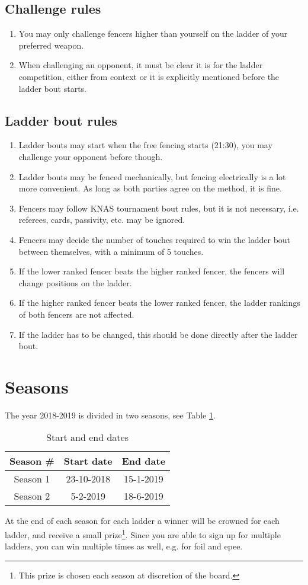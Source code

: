 \documentclass{article}
\begin{document}
\subsection{Challenge rules}
\begin{enumerate}
    \item You may only challenge fencers higher than yourself on the ladder of your preferred weapon.
    \item When challenging an opponent, it must be clear it is for the ladder competition, either from context or it is explicitly mentioned before the ladder bout starts.
\end{enumerate}
\subsection{Ladder bout rules}
\begin{enumerate}
    \item Ladder bouts may start when the free fencing starts (21:30), you may challenge your opponent before though.
    \item Ladder bouts may be fenced mechanically, but fencing electrically is a lot more convenient. As long as both parties agree on the method, it is fine.
    \item Fencers may follow KNAS tournament bout rules, but it is not necessary, i.e. referees, cards, passivity, etc. may be ignored.
    \item Fencers may decide the number of touches required to win the ladder bout between themselves, with a minimum of 5 touches.
    \item If the lower ranked fencer beats the higher ranked fencer, the fencers will change positions on the ladder.
    \item If the higher ranked fencer beats the lower ranked fencer, the ladder rankings of both fencers are not affected.
    \item If the ladder has to be changed, this should be done directly after the ladder bout.
\end{enumerate}
\section{Seasons} \label{sec:Seasons}
The year 2018-2019 is divided in two seasons, see Table \ref{tab:dates}.
\begin{table}[ht]
    \centering
    \begin{tabular}{|c|c|c|}
        \hline
        Season \# & Start date & End date \\ \hline
        Season 1 & 23-10-2018 & 15-1-2019 \\ \hline
        Season 2 & 5-2-2019 & 18-6-2019 \\ \hline
    \end{tabular}
    \caption{Start and end dates}
    \label{tab:dates}
\end{table}
At the end of each season for each ladder a winner will be crowned for each ladder, and receive a small prize\footnote{This prize is chosen each season at discretion of the board.}. Since you are able to sign up for multiple ladders, you can win multiple times as well, e.g. for foil and epee.
\end{document}
